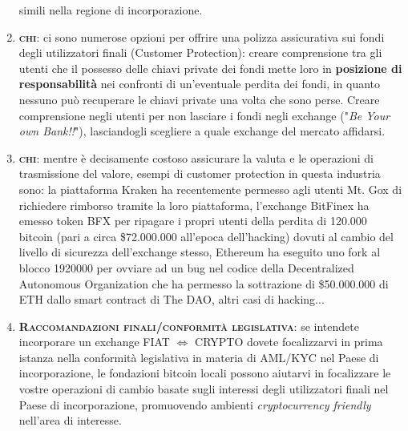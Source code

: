 \begin{enumerate}
	simili nella regione di incorporazione. 
	\item \textbf{\textsc{chi}}: ci sono numerose opzioni per offrire una polizza assicurativa sui fondi degli utilizzatori finali (Customer Protection):
	creare comprensione tra gli utenti che il possesso delle chiavi private dei fondi mette loro in \textbf{posizione di responsabilità} 
	nei confronti di un'eventuale perdita dei fondi, in quanto nessuno può recuperare le chiavi private una volta che sono perse. 
	Creare comprensione negli utenti per non lasciare i fondi negli exchange ("\textit{Be Your own Bank!!}"), lasciandogli scegliere a quale
	exchange del mercato affidarsi.
	\item \textbf{\textsc{chi}}: mentre è decisamente costoso assicurare la valuta e le operazioni di trasmissione del valore, esempi di customer protection
	in questa industria sono: la piattaforma Kraken ha recentemente permesso agli utenti Mt. Gox di richiedere rimborso tramite
	la loro piattaforma, l'exchange BitFinex ha emesso token BFX per ripagare i propri utenti della perdita di 120.000 bitcoin (pari a circa \$72.000.000
	all'epoca dell'hacking) dovuti al cambio del livello di sicurezza dell'exchange stesso, Ethereum ha eseguito uno fork al blocco 1920000
	per ovviare ad un bug nel codice della Decentralized Autonomous Organization che ha permesso la sottrazione di \$50.000.000 di ETH dallo smart contract
	di The DAO, altri casi di hacking...
	\item \textbf{\textsc{Raccomandazioni finali/conformità legislativa}}: se intendete incorporare un exchange 
	FIAT $\Leftrightarrow$ CRYPTO dovete focalizzarvi in prima istanza nella conformità legislativa in materia 
	di AML/KYC nel Paese di incorporazione, le fondazioni
	bitcoin locali possono aiutarvi in focalizzare le vostre operazioni di cambio basate sugli interessi degli utilizzatori finali 
	nel Paese di incorporazione, promuovendo ambienti \textit{cryptocurrency friendly} nell'area di interesse.
\end{enumerate}
